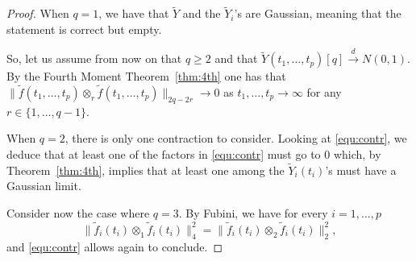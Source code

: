 \documentclass[12pt]{article}
\DeclareMathOperator{\1}{1}
\theoremstyle{plain}
\theoremstyle{definition}
\begin{document}
\begin{proof} When $q=1$, we have that $\widetilde Y$ and the $\widetilde Y_i$'s are Gaussian, 
meaning that the statement is correct but empty. 

So, let us assume from now on that $q\ge2$ and that $\widetilde{Y}(t_1,\ldots,t_p)[q]\overset{d}{\rightarrow} N(0,1)$. By the Fourth Moment Theorem~\ref{thm:4th} one has that 
$\|\widetilde f{(t_1,\ldots,t_p)}\otimes_r \widetilde f{(t_1,\ldots,t_p)}\|_{2q-2r}\to 0$
as $t_1,\ldots,t_p\rightarrow\infty$ for any $r\in\{1,\dots,q-1\}$.

When $q=2$, there is only one contraction to consider. Looking at 
\eqref{equ:contr}, we deduce that at least one of the factors in \eqref{equ:contr} must go to $0$ which, by Theorem~\ref{thm:4th}, implies that at least one among the $\widetilde Y_i(t_i)$'s must have a Gaussian limit. 

Consider now the case where $q= 3$.
By Fubini, we have for every $i=1,\ldots, p$
\begin{equation}\label{equ:symContr}    \|\widetilde f_i(t_i)\otimes_{1} \widetilde f_i(t_i)\|_{4}^2=\|\widetilde f_i(t_i)\otimes_{2}\widetilde f_i(t_i)\|_{2}^2, \end{equation}
and \eqref{equ:contr} allows again to conclude. 


\end{proof}
\end{document}

